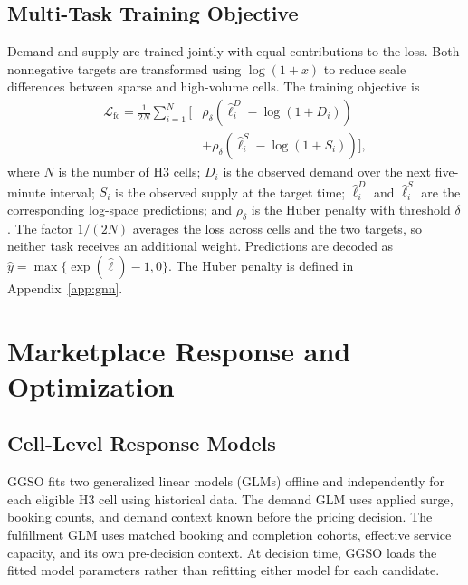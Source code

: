 \documentclass[a4paper,10pt,twocolumn]{article}
\begin{document}
\subsection{Multi-Task Training Objective}
Demand and supply are trained jointly with equal contributions to the loss.
Both nonnegative targets are transformed using $\log(1+x)$ to reduce scale
differences between sparse and high-volume cells. The training objective is
\begin{equation}
\begin{aligned}
 \mathcal L_{\mathrm{fc}}=\frac{1}{2N}\sum_{i=1}^{N}\bigl[&
 \rho_{\delta}(\widehat\ell_i^D-\log(1+D_i))\\
 &+\rho_{\delta}(\widehat\ell_i^S-\log(1+S_i))\bigr],
\end{aligned}
\label{eq:forecastloss}
\end{equation}
where $N$ is the number of H3 cells; $D_i$ is the observed demand over the
next five-minute interval; $S_i$ is the observed supply at the target time;
$\widehat\ell_i^D$ and $\widehat\ell_i^S$ are the corresponding log-space
predictions; and $\rho_{\delta}$ is the Huber penalty with threshold $\delta$.
The factor $1/(2N)$ averages the loss across cells and the two targets, so
neither task receives an additional weight. Predictions are decoded as
$\widehat y=\max\{\exp(\widehat\ell)-1,0\}$. The Huber penalty is defined in
Appendix~\ref{app:gnn}.

\section{Marketplace Response and Optimization}
\subsection{Cell-Level Response Models}
GGSO fits two generalized linear models (GLMs) offline and independently for
each eligible H3 cell using historical data. The demand GLM uses applied
surge, booking counts, and demand context known before the pricing decision.
The fulfillment GLM uses matched booking and completion cohorts, effective
service capacity, and its own pre-decision context. At decision time, GGSO
loads the fitted model parameters rather than refitting either model for each
candidate.
\end{document}
